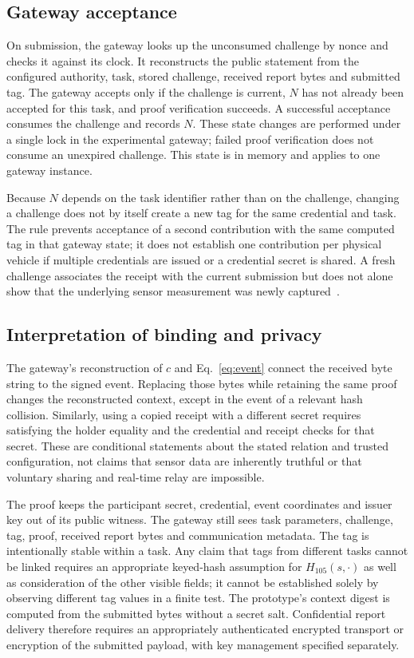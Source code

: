 \subsection{Gateway acceptance}
\label{sec:acceptance}

On submission, the gateway looks up the unconsumed challenge by nonce and checks it against its clock. It reconstructs the public statement from the configured authority, task, stored challenge, received report bytes and submitted tag. The gateway accepts only if the challenge is current, $N$ has not already been accepted for this task, and proof verification succeeds. A successful acceptance consumes the challenge and records $N$. These state changes are performed under a single lock in the experimental gateway; failed proof verification does not consume an unexpired challenge. This state is in memory and applies to one gateway instance.

Because $N$ depends on the task identifier rather than on the challenge, changing a challenge does not by itself create a new tag for the same credential and task. The rule prevents acceptance of a second contribution with the same computed tag in that gateway state; it does not establish one contribution per physical vehicle if multiple credentials are issued or a credential secret is shared. A fresh challenge associates the receipt with the current submission but does not alone show that the underlying sensor measurement was newly captured~\cite{Birkholz2023RATS}.

\subsection{Interpretation of binding and privacy}
\label{sec:interpretation}

The gateway's reconstruction of $c$ and Eq.~\eqref{eq:event} connect the received byte string to the signed event. Replacing those bytes while retaining the same proof changes the reconstructed context, except in the event of a relevant hash collision. Similarly, using a copied receipt with a different secret requires satisfying the holder equality and the credential and receipt checks for that secret. These are conditional statements about the stated relation and trusted configuration, not claims that sensor data are inherently truthful or that voluntary sharing and real-time relay are impossible.

The proof keeps the participant secret, credential, event coordinates and issuer key out of its public witness. The gateway still sees task parameters, challenge, tag, proof, received report bytes and communication metadata. The tag is intentionally stable within a task. Any claim that tags from different tasks cannot be linked requires an appropriate keyed-hash assumption for $H_{105}(s,\cdot)$ as well as consideration of the other visible fields; it cannot be established solely by observing different tag values in a finite test. The prototype's context digest is computed from the submitted bytes without a secret salt. Confidential report delivery therefore requires an appropriately authenticated encrypted transport or encryption of the submitted payload, with key management specified separately.
